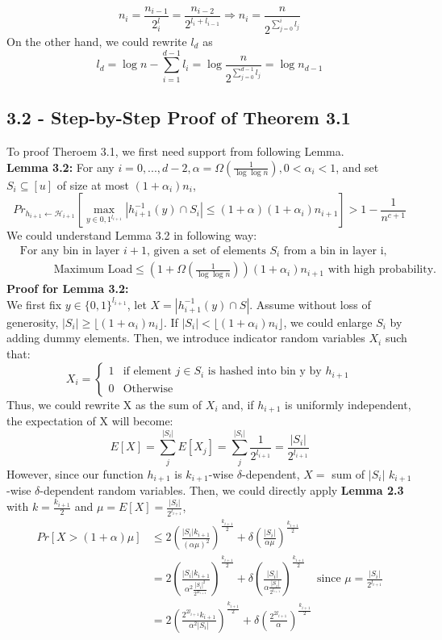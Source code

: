 \documentclass[a4paper, english]{paper}
\begin{document}
$$n_i = \frac{n_{i-1}}{2^l_i} = \frac{n_{i-2}}{2^{l_i+l_{i-1}}} \Rightarrow n_i = \frac{n}{2^{\sum_{j=0}^i l_j}}$$
On the other hand, we could rewrite $l_d$ as $$l_d = \log n - \sum_{i=1}^{d-1}l_i = \log\frac{n}{2^{\sum_{j=0}^{d-1} l_j}} =\log n_{d-1}$$

 	\subsection{3.2 - Step-by-Step Proof of Theorem 3.1}
	To proof Theroem 3.1, we first need support from following Lemma.\\
	
	\noindent\textbf{Lemma 3.2:} For any $i = {0,...,d-2},\alpha = \Omega(\frac1{\log\log n}), 0<\alpha_i<1$, and set $S_i\subseteq[u]$ of size at most $(1+\alpha_i)n_i$,
	$${Pr}_{h_{i+1}\leftarrow \mathscr{H}_{i+1}}\left[\max_{y\in{0,1}^{l_{i+1}}}|h_{i+1}^{-1}(y) \cap S_i|\le(1+\alpha)(1+\alpha_i)n_{i+1}\right]> 1-\frac1{n^{c+1}}$$
	We could understand Lemma 3.2 in following way:
	\begin{align*}
	&\text{For any bin in layer $i+1$, given a set of elements $S_i$ from a bin in layer i,}\\
	&\qquad\quad \text{Maximum Load} \le \left(1+\Omega(\frac1 {\log\log n})\right)(1+\alpha_i)n_{i+1} \text{ with high probability.}
	\end{align*}
	\noindent\textbf{Proof for Lemma 3.2:} \\
	We first fix $y\in\{0,1\}^{l_{i+1}}$, let $X=|h_{i+1}^{-1}(y)\cap S|$. Assume without loss of generosity, $|S_i|\ge \lfloor (1+\alpha_i)n_i\rfloor$. If $|S_i|< \lfloor (1+\alpha_i)n_i\rfloor$, we could enlarge $S_i$ by adding dummy elements. Then, we introduce indicator random variables $X_i$ such that:
\[ X_i=\begin{cases} 
      1 & \text{if element }j\in S_i\text{ is hashed into bin y by }h_{i+1} \\
      0 & \text{Otherwise}
   \end{cases}
\]
	Thus, we could rewrite X as the sum of $X_i$ and, if $h_{i+1}$ is uniformly independent, the expectation of X will become:
	$$E[X] = \sum_j^{|S_i|}E[X_j]=\sum_j^{|S_i|}\frac1{2^{l_{i+1}}} = \frac{|S_i|}{2^{l_{i+1}}}$$
	However, since our function $h_{i+1}$ is $k_{i+1}$-wise $\delta$-dependent, $X=$ sum of $|S_i|$ $k_{i+1}$-wise $\delta$-dependent random variables. Then, we could directly apply \textbf{Lemma 2.3} with $k = \frac{k_{i+1}}2$ and $\mu =E[X]=\frac{|S_i|}{2^{l_{i+1}}}$,
	\begin{align*}
	Pr[X>(1+\alpha)\mu] &\le 2\left(\frac{|S_i|k_{i+1}}{(\alpha\mu)^2}\right)^{\frac{k_{i+1}}2}+\delta\left( \frac{|S_i|}{\alpha\mu}\right)^{\frac{k_{i+1}}2}\\
	&= 2\left(\frac{|S_i|k_{i+1}}{\alpha^2 \frac{|S_i|^2}{2^{2l_{i+1}}}}\right)^{\frac{k_{i+1}}2} +\delta\left( \frac{|S_i|}{\alpha\frac{|S_i|}{2^{l_{i+1}}}}\right)^{\frac{k_{i+1}}2}\quad\text{since }\mu =\frac{|S_i|}{2^{l_{i+1}}}\\
	&= 2\left(\frac{2^{2l_{i+1}}k_{i+1}}{\alpha^2 |S_i|}\right)^{\frac{k_{i+1}}2} +\delta\left( \frac{2^{2l_{i+1}}}{\alpha}\right)^{\frac{k_{i+1}}2}
	\end{align*}
\end{document}
